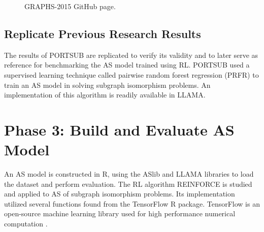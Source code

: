 \begin{figure}[H]
	\centering
	\caption[GRAPHS-2015 GitHub page]{GRAPHS-2015 GitHub page.}
	\label{fig:graphs2015github}
\end{figure}

\subsection{Replicate Previous Research Results}
The results of PORTSUB are replicated to verify its validity and to later serve as reference for benchmarking the AS model trained using RL. PORTSUB used a supervised learning technique called pairwise random forest regression (PRFR) to train an AS model in solving subgraph isomorphism problems. An implementation of this algorithm is readily available in LLAMA.

\section{Phase 3: Build and Evaluate AS Model}

An AS model is constructed in R, using the ASlib and LLAMA libraries to load the dataset and perform evaluation. The RL algorithm REINFORCE is studied and applied to AS of subgraph isomorphism problems. Its implementation utilized several functions found from the TensorFlow R package. TensorFlow is an open-source machine learning library used for high performance numerical computation \citep{abadi2016tensorflow}.

